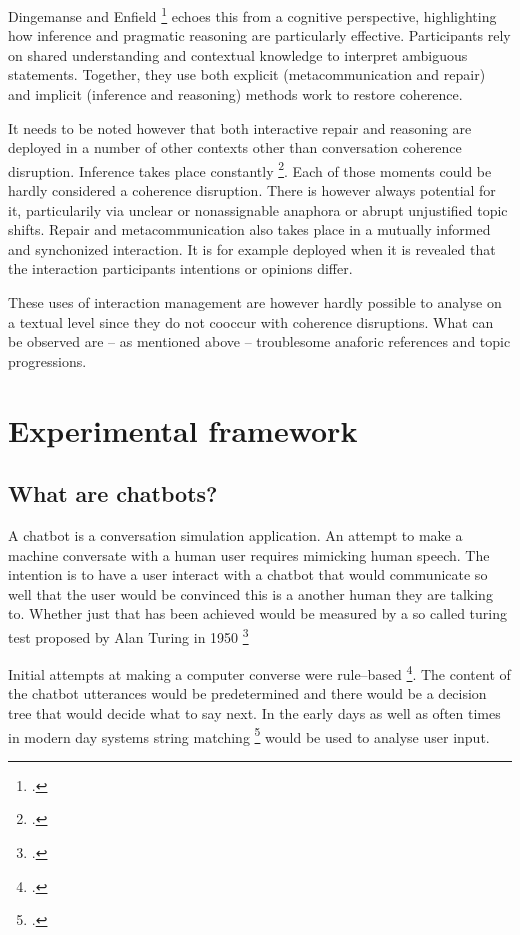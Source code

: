 \documentclass[12pt]{report}
\begin{document}
{\par
Dingemanse and Enfield \footcite{DINGEMANSE202430} echoes this from a cognitive perspective,
highlighting how inference and pragmatic reasoning are particularly effective.
Participants rely on shared understanding and contextual knowledge to interpret ambiguous statements.
Together, they use both
explicit (metacommunication and repair) and
implicit (inference and reasoning)
methods work to restore coherence.

\par
It needs to be noted however that both interactive repair and reasoning are
deployed in a number of other contexts
other than conversation coherence disruption.
Inference takes place constantly \footcite{garfinkelstudies}.
Each of those moments could be hardly considered a coherence disruption.
There is however always potential for it,
particularily via unclear or nonassignable anaphora or abrupt unjustified topic shifts.
Repair and metacommunication also takes place in a mutually informed and synchonized interaction.
It is for example deployed when it is revealed
that the interaction participants intentions or opinions differ.

\par
These uses of interaction management are however
hardly possible to analyse on a textual level
since they do not cooccur with coherence disruptions.
What can be observed are – as mentioned above –
troublesome anaforic references and topic progressions.


%

\chapter{Experimental framework}

\section{What are chatbots?}
\par
A chatbot is a conversation simulation application.
An attempt to make a machine conversate with a human user requires mimicking human speech.
The intention is to have a user interact with a chatbot
that would communicate so well that
the user would be convinced
this is a another human they are talking to.
Whether just that has been achieved would be measured by a so called turing test
proposed by Alan Turing in 1950 \footcite{turing1950computing}

\par
Initial attempts at making a computer converse were rule–based \footcite[p.~43]{mctear2020conversational}.
The content of the chatbot utterances
would be predetermined
and there would be a decision tree that would decide what to say next.
In the early days as well as often times in modern day systems
string matching \footcite{stringmatching} would be used to analyse user input.

}
\end{document}
